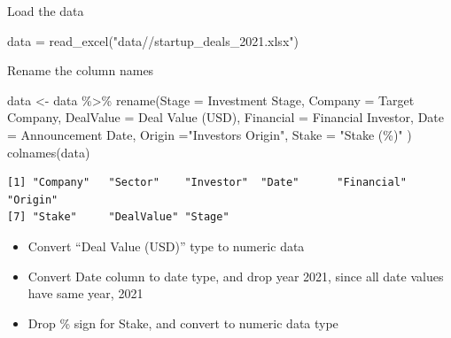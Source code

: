 \documentclass[
  letterpaper,
  DIV=11,
  numbers=noendperiod]{scrreprt}
\newenvironment{Shaded}{\begin{snugshade}}{\end{snugshade}}
\newcommand{\AttributeTok}[1]{\textcolor[rgb]{0.40,0.45,0.13}{#1}}
\newcommand{\FunctionTok}[1]{\textcolor[rgb]{0.28,0.35,0.67}{#1}}
\newcommand{\NormalTok}[1]{\textcolor[rgb]{0.00,0.23,0.31}{#1}}
\newcommand{\OtherTok}[1]{\textcolor[rgb]{0.00,0.23,0.31}{#1}}
\newcommand{\SpecialCharTok}[1]{\textcolor[rgb]{0.37,0.37,0.37}{#1}}
\newcommand{\StringTok}[1]{\textcolor[rgb]{0.13,0.47,0.30}{#1}}
\providecommand{\tightlist}{%
  \setlength{\itemsep}{0pt}\setlength{\parskip}{0pt}}\usepackage{longtable,booktabs,array}
\begin{document}
Load the data

\begin{Shaded}
\begin{Highlighting}[]
\NormalTok{data }\OtherTok{=} \FunctionTok{read\_excel}\NormalTok{(}\StringTok{"data//startup\_deals\_2021.xlsx"}\NormalTok{)}
\end{Highlighting}
\end{Shaded}

Rename the column names

\begin{Shaded}
\begin{Highlighting}[]
\NormalTok{data }\OtherTok{\textless{}{-}}\NormalTok{ data }\SpecialCharTok{\%\textgreater{}\%} 
  \FunctionTok{rename}\NormalTok{(}\AttributeTok{Stage =} \StringTok{\textquotesingle{}Investment Stage\textquotesingle{}}\NormalTok{,}
         \AttributeTok{Company =} \StringTok{\textquotesingle{}Target Company\textquotesingle{}}\NormalTok{,}
         \AttributeTok{DealValue =} \StringTok{\textquotesingle{}Deal Value (USD)\textquotesingle{}}\NormalTok{,}
         \AttributeTok{Financial =} \StringTok{\textquotesingle{}Financial Investor\textquotesingle{}}\NormalTok{,}
         \AttributeTok{Date =} \StringTok{\textquotesingle{}Announcement Date\textquotesingle{}}\NormalTok{,}
         \AttributeTok{Origin =}\StringTok{"Investor\textquotesingle{}s Origin"}\NormalTok{,}
         \AttributeTok{Stake =} \StringTok{"Stake (\%)"}
\NormalTok{  )}
\FunctionTok{colnames}\NormalTok{(data)}
\end{Highlighting}
\end{Shaded}

\begin{verbatim}
[1] "Company"   "Sector"    "Investor"  "Date"      "Financial" "Origin"   
[7] "Stake"     "DealValue" "Stage"    
\end{verbatim}

\begin{itemize}
\tightlist
\item
  Convert ``Deal Value (USD)'' type to numeric data
\item
  Convert Date column to date type, and drop year 2021, since all date
  values have same year, 2021
\item
  Drop \% sign for Stake, and convert to numeric data type
\end{itemize}
\end{document}
